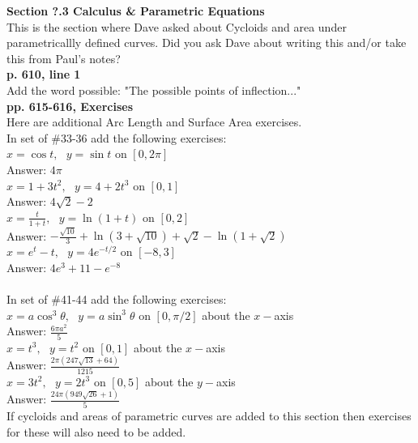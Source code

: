 \documentclass[11pt]{report}
\newcommand{\ds}{\displaystyle}
\begin{document}
\textbf{Section ?.3 Calculus \& Parametric Equations}\\

This is the section where Dave asked about Cycloids and area under parametricallly defined curves. Did you ask Dave about writing this and/or take this from Paul's notes?\\

\textbf{p. 610, line 1}\\
Add the word possible: "The possible points of inflection..."\\


\textbf{pp. 615-616, Exercises}\\

Here are additional Arc Length and Surface Area exercises.\\

In set of \#33-36 add the following exercises:\\

$\ds x=\cos t,~~~ y=\sin t$ on $\ds [0,2\pi]$\\

Answer: $4\pi$\\

$\ds x=1+3t^2,~~~ y=4+2t^3$ on $\ds [0,1]$\\

Answer: $4\sqrt{2} -2$\\

$\ds x=\frac{t}{1+t},~~~ y=\ln (1+t)$ on $\ds [0,2]$\\

Answer: $\ds -\frac{\sqrt{10}}{3} + \ln(3+\sqrt {10}) + \sqrt 2 - \ln (1+\sqrt 2)$\\

$\ds x=e^t-t,~~~ y=4e^{-t/2}$ on $\ds [-8,3]$\\

Answer: $4e^3 + 11 - e^{-8}$\\ \\


In set of \#41-44 add the following exercises:\\

$\ds x=a\cos^3 \theta,~~~ y=a\sin^3 \theta$ on $\ds [0,\pi/2]$ about the $x-$axis \\

Answer: $\frac{6\pi a^2}{5}$\\

$\ds x=t^3,~~~ y=t^2$ on $\ds [0,1]$ about the $x-$axis\\

Answer: $\frac{2\pi (247\sqrt{13}+64)}{1215}$\\

$\ds x=3t^2,~~~ y=2t^3$ on $\ds [0,5]$ about the $y-$axis\\

Answer: $\frac{24\pi (949\sqrt{26}+1)}{5}$\\



If cycloids and areas of parametric curves are added to this section then exercises for these will also need to be added.
\end{document}
